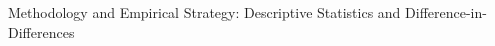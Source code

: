 \documentclass[serif, aspectratio=169]{beamer}
\begin{document}


\begin{frame}{Methodology and Empirical Strategy: Descriptive Statistics and  Difference-in-Differences}






\end{frame}
\end{document}
